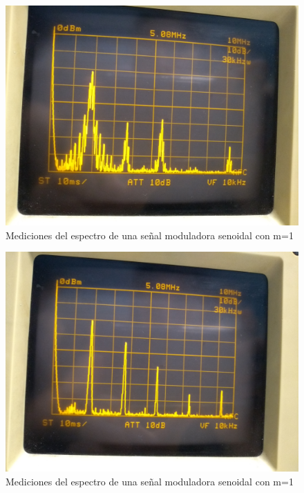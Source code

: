 \documentclass[../../labo_tp5_main.tex]{subfiles}
\begin{document}
\begin{figure}[H]	
	\centering
	\includegraphics[scale=0.05]{imagenes/labo_tp5_ej3_c_2.jpg}
	\caption{Mediciones del espectro de una señal moduladora senoidal con m=1}
	\label{fig:ej1_labo_tp5_ej3_c_2}
\end{figure}
\begin{figure}[H]	
	\centering
	\includegraphics[scale=0.05]{imagenes/labo_tp5_ej3_d.jpg}
	\caption{Mediciones del espectro de una señal moduladora senoidal con m=1}
	\label{fig:ej1_labo_tp5_ej3_d}
\end{figure}
\end{document}
